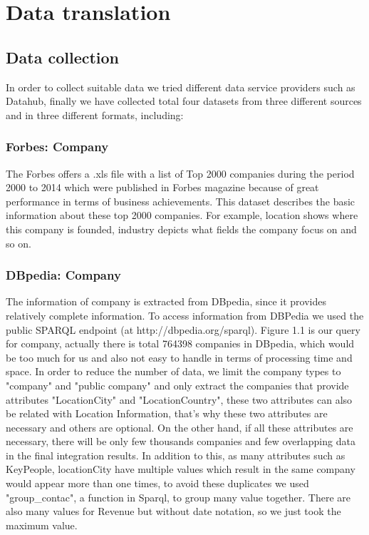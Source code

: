 \section{Data translation}
\subsection{Data collection}
In order to collect suitable data we tried different data service providers such as Datahub, finally we have collected total four datasets from three different sources and in three different formats, including: 





\subsubsection{Forbes: Company}
The Forbes offers a .xls file with a list of Top 2000 companies during the period 2000 to 2014 which were published in Forbes magazine because of great performance in terms of business achievements. This dataset describes the basic information about these top 2000 companies. For example, location shows where this company is founded, industry depicts what fields the company focus on and so on.
\subsubsection{DBpedia: Company }
The information of company is extracted from DBpedia, since it provides relatively complete information.  To access information from DBPedia we used the public SPARQL endpoint (at http://dbpedia.org/sparql). Figure 1.1 is our query for company, actually there is total 764398 companies in DBpedia, which would be too much for us and also not easy to handle in terms of processing time and space. In order to reduce the number of data, we limit the company types to "company" and "public company" and only extract the companies that provide attributes "LocationCity" and "LocationCountry", these two attributes can also be related with Location Information, that's why these two attributes are necessary and others are optional. On the other hand, if all these attributes are necessary, there will be only few thousands companies and few overlapping data in the final integration results. In addition to this, as many attributes such as KeyPeople, locationCity have multiple values which result in the same company would appear more than one times, to avoid these duplicates we used "group\_contac", a function in Sparql, to group many value together. There are also many values for Revenue but without date notation, so we just took the maximum value. 

